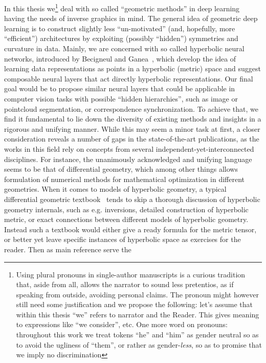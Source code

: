 In this thesis we\footnote{
Using plural pronouns in single-author manuscripts is a curious tradition that,
aside from all, allows the narrator to sound less pretentios, as if speaking
from outside, avoiding personal claims. The pronoun might however still need
some justification and we propose the following: let's assume that within this
thesis ``we'' refers to narrator and the Reader. This gives meaning to
expressions like ``we consider'', etc.  One more word on pronouns: throughout
this work we treat tokens ``he'' and ``him'' as gender neutral so as to avoid
the ugliness of ``them'', or rather as gender-\emph{less}, so as to promise
that we imply no discrimination}
deal with so called ``geometric methods'' in deep learning having the needs of
inverse graphics in mind. The general idea of geometric deep learning is to
construct slightly less ``un-motivated'' (and, hopefully, more ``efficient'')
architectures by exploiting (possibly ``hidden'') symmetries and curvature in
data. Mainly, we are concerned with so called hyperbolic neural networks,
introduced by Becigneul and Ganea~\cite{ganeaHNNs}, which develop the idea of
learning data representations as points in a hyperbolic (metric) space and
suggest composable neural layers that act directly hyperbolic representations.
Our final goal would be to propose similar neural layers that could be
applicable in computer vision tasks with possible ``hidden hierarchies'', such
as image or pointcloud segmentation, or correspondence synchronization. To
achieve that, we find it fundamental to lie down the diversity of existing
methods and insights in a rigorous and unifying manner. While this may seem a
minor task at first, a closer consideration reveals a number of gaps in the
state-of-the-art publications, as the works in this field rely on concepts from
several independent-yet-interconnected disciplines. For instance, the
unanimously acknowledged and unifying language seems to be that of differential
geometry, which among other things allows formulation of numerical methods for
mathematical optimization in different geometries. When it comes to models of
hyperbolic geometry, a typical differential geometric
textbook~\cite{leeRiem,leeSmooth} tends to skip a thorough discussion of
hyperbolic geometry internals, such as e.g.  inversions, detailed
construction of hyperbolic metric, or exact connections between different
models of hyperbolic geometry. Instead such a textbook would either give a
ready formula for the metric tensor, or better yet leave specific instances of
hyperbolic space as exercises for the reader. Then as main reference serve the
